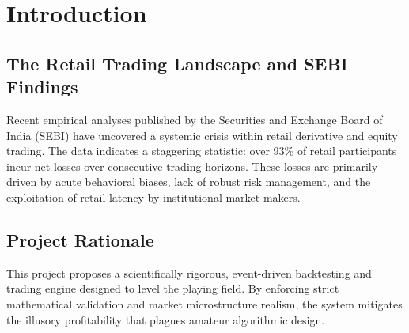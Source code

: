 \chapter{Introduction}
\section{The Retail Trading Landscape and SEBI Findings}
Recent empirical analyses published by the Securities and Exchange Board of India (SEBI) have uncovered a systemic crisis within retail derivative and equity trading. The data indicates a staggering statistic: over 93\% of retail participants incur net losses over consecutive trading horizons. These losses are primarily driven by acute behavioral biases, lack of robust risk management, and the exploitation of retail latency by institutional market makers.
\section{Project Rationale}
This project proposes a scientifically rigorous, event-driven backtesting and trading engine designed to level the playing field. By enforcing strict mathematical validation and market microstructure realism, the system mitigates the illusory profitability that plagues amateur algorithmic design.
